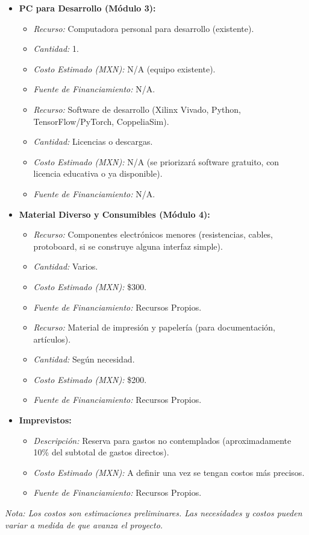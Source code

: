 \documentclass[12pt]{article}
\begin{document}
\begin{itemize}
    \item \textbf{PC para Desarrollo (Módulo 3):}
        \begin{itemize}
            \item \textit{Recurso:} Computadora personal para desarrollo (existente).
            \item \textit{Cantidad:} 1.
            \item \textit{Costo Estimado (MXN):} N/A (equipo existente).
            \item \textit{Fuente de Financiamiento:} N/A.
            \item \textit{Recurso:} Software de desarrollo (Xilinx Vivado, Python, TensorFlow/PyTorch, CoppeliaSim).
            \item \textit{Cantidad:} Licencias o descargas.
            \item \textit{Costo Estimado (MXN):} N/A (se priorizará software gratuito, con licencia educativa o ya disponible).
            \item \textit{Fuente de Financiamiento:} N/A.
        \end{itemize}
    \item \textbf{Material Diverso y Consumibles (Módulo 4):}
        \begin{itemize}
            \item \textit{Recurso:} Componentes electrónicos menores (resistencias, cables, protoboard, si se construye alguna interfaz simple).
            \item \textit{Cantidad:} Varios.
            \item \textit{Costo Estimado (MXN):} \$300.
            \item \textit{Fuente de Financiamiento:} Recursos Propios.
            \item \textit{Recurso:} Material de impresión y papelería (para documentación, artículos).
            \item \textit{Cantidad:} Según necesidad.
            \item \textit{Costo Estimado (MXN):} \$200.
            \item \textit{Fuente de Financiamiento:} Recursos Propios.
        \end{itemize}
    \item \textbf{Imprevistos:}
        \begin{itemize}
            \item \textit{Descripción:} Reserva para gastos no contemplados (aproximadamente 10\% del subtotal de gastos directos).
            \item \textit{Costo Estimado (MXN):} A definir una vez se tengan costos más precisos.
            \item \textit{Fuente de Financiamiento:} Recursos Propios.
        \end{itemize}
\end{itemize}
\textit{Nota: Los costos son estimaciones preliminares. Las necesidades y costos pueden variar a medida de que avanza el proyecto.}
\end{document}
